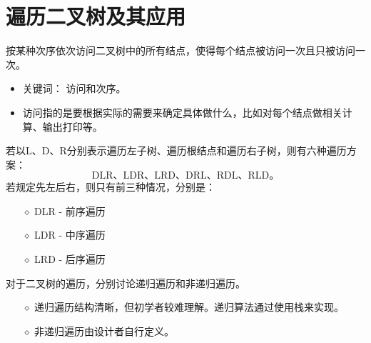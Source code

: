 \section{遍历二叉树及其应用}

\begin{frame}\ft{\secname}

\begin{dingyi}
按某种次序依次访问二叉树中的所有结点，使得每个结点被访问一次且只被访问一次。
\end{dingyi}

\vspace{0.1in}

\begin{zhu}
\begin{itemize}
\item \textcolor{acolor5}{关键词：} 访问和次序。\\[0.1in]
\item 访问指的是要根据实际的需要来确定具体做什么，比如对每个结点做相关计算、输出打印等。
\end{itemize}
\end{zhu}

\end{frame}
%
%
\begin{frame}\ft{\secname}

若以L、D、R分别表示遍历左子树、遍历根结点和遍历右子树，则有六种遍历方案：
$$
\mbox{DLR、LDR、LRD、DRL、RDL、RLD。}
$$
若规定先左后右，则只有前三种情况，分别是：
\begin{itemize}
\item[$\diamond$]
DLR - 前序遍历
\item[$\diamond$]
LDR - 中序遍历
\item[$\diamond$]
LRD - 后序遍历
\end{itemize}
\end{frame}
%
%
\begin{frame}\ft{\subsecname}

对于二叉树的遍历，分别讨论递归遍历和非递归遍历。

\begin{itemize}
\item[$\diamond$]
 递归遍历结构清晰，但初学者较难理解。递归算法通过使用栈来实现。\\[0.1in]
\item[$\diamond$]
 非递归遍历由设计者自行定义。
\end{itemize}
\end{frame}

